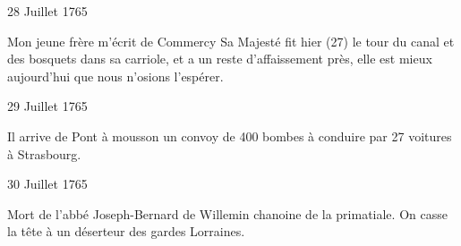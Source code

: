                      \begin{diary}{28 Juillet 1765}{}
                        
                        
                           Mon jeune frère m'écrit
                           de Commercy
                           \og Sa Majesté
                              fit hier (27) le tour du canal et
                              des bosquets dans
                              sa carriole, et a un reste d'affaissement près,
                              elle est mieux aujourd'hui que nous n'osions
                              l'espérer. \fg{}
                        \bigskip
        
        
                     \end{diary}

                     \begin{diary}{29 Juillet 1765}{}
                        
                         Il arrive de Pont à mousson un convoy de 400
                           bombes à conduire par 27 voitures à Strasbourg. \bigskip
        
        
                     \end{diary}

                     \begin{diary}{30 Juillet 1765}{}
                        
                         Mort de l'abbé Joseph-Bernard de
                              Willemin chanoine de la
                              primatiale.
                           On casse la tête à un
                           déserteur des gardes Lorraines. \bigskip
        
        
                     \end{diary}


